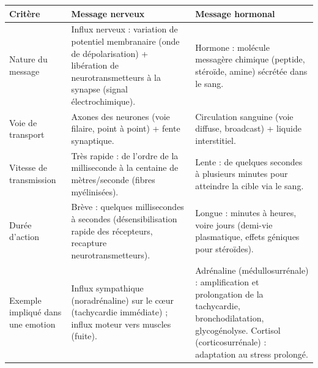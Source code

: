 \documentclass[11pt]{article}
\newcounter{popsec}
\newcounter{popsub}
\newcommand{\courssub}[1]{%
  \stepcounter{popsub}%
  \par\vspace{9pt}\noindent{\popxbold\fontsize{11.5}{13}\selectfont\color{popink}{\color{poporange}\thepopsec.\thepopsub}\hspace{6pt}#1}\par\nopagebreak\vspace{4pt}
}
\begin{document}
\begin{corrige}
\begin{center}
\begin{tabularx}{\linewidth}{|l|X|X|}
\hline
\rowcolor{popblueL} \textbf{Critère} & \textbf{Message nerveux} & \textbf{Message hormonal} \\
\hline
Nature du message & Influx nerveux : variation de potentiel membranaire (onde de dépolarisation) + libération de neurotransmetteurs à la synapse (signal électrochimique). & Hormone : molécule messagère chimique (peptide, stéroïde, amine) sécrétée dans le sang. \\
\hline
Voie de transport & Axones des neurones (voie filaire, point à point) + fente synaptique. & Circulation sanguine (voie diffuse, broadcast) + liquide interstitiel. \\
\hline
Vitesse de transmission & Très rapide : de l'ordre de la milliseconde à la centaine de mètres/seconde (fibres myélinisées). & Lente : de quelques secondes à plusieurs minutes pour atteindre la cible via le sang. \\
\hline
Durée d'action & Brève : quelques millisecondes à secondes (désensibilisation rapide des récepteurs, recapture neurotransmetteurs). & Longue : minutes à heures, voire jours (demi-vie plasmatique, effets géniques pour stéroïdes). \\
\hline
Exemple impliqué dans une emotion & Influx sympathique (noradrénaline) sur le cœur (tachycardie immédiate) ; influx moteur vers muscles (fuite). & Adrénaline (médullosurrénale) : amplification et prolongation de la tachycardie, bronchodilatation, glycogénolyse. Cortisol (corticosurrénale) : adaptation au stress prolongé. \\
\hline
\end{tabularx}
\end{center}
\end{corrige}

\courssub{Je m'entraîne}
\end{document}
